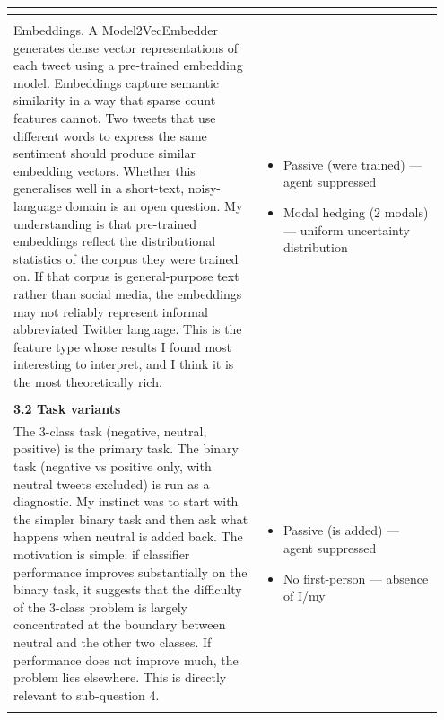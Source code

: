 \documentclass[11pt]{article}
\begin{document}
\begin{longtable}{|p{0.55\linewidth}|p{0.40\linewidth}|}
\begin{itemize}[leftmargin=1em,itemsep=1pt,topsep=1pt,parsep=0pt]
\end{itemize} \\[2pt]
\hline
\rule{0pt}{3.5cm} & \\
\hline
Embeddings. A Model2VecEmbedder generates dense vector representations of each tweet using a pre-trained embedding model. Embeddings capture semantic similarity in a way that sparse count features cannot. Two tweets that use different words to express the same sentiment should produce similar embedding vectors. Whether this generalises well in a short-text, noisy-language domain is an open question. My understanding is that pre-trained embeddings reflect the distributional statistics of the corpus they were trained on. If that corpus is general-purpose text rather than social media, the embeddings may not reliably represent informal abbreviated Twitter language. This is the feature type whose results I found most interesting to interpret, and I think it is the most theoretically rich. & \begin{itemize}[leftmargin=1em,itemsep=1pt,topsep=1pt,parsep=0pt]
  \item Passive (were trained) --- agent suppressed
  \item Modal hedging (2 modals) --- uniform uncertainty distribution
\end{itemize} \\[2pt]
\hline
\rule{0pt}{3.5cm} & \\
\hline
\textbf{3.2 Task variants}\\[4pt]
The 3-class task (negative, neutral, positive) is the primary task. The binary task (negative vs positive only, with neutral tweets excluded) is run as a diagnostic. My instinct was to start with the simpler binary task and then ask what happens when neutral is added back. The motivation is simple: if classifier performance improves substantially on the binary task, it suggests that the difficulty of the 3-class problem is largely concentrated at the boundary between neutral and the other two classes. If performance does not improve much, the problem lies elsewhere. This is directly relevant to sub-question 4. & \begin{itemize}[leftmargin=1em,itemsep=1pt,topsep=1pt,parsep=0pt]
  \item Passive (is added) --- agent suppressed
  \item No first-person --- absence of I/my
\end{itemize} \\[2pt]
\hline
\rule{0pt}{3.5cm} & \\

\end{longtable}
\end{document}
